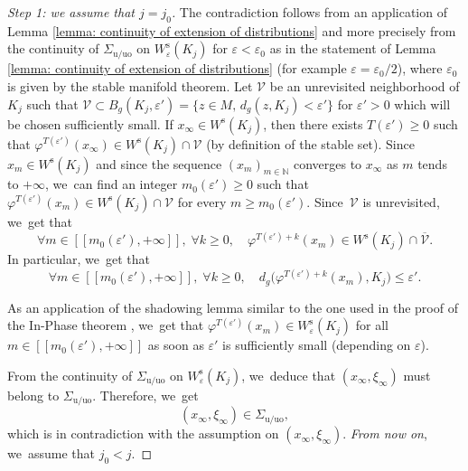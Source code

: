 \documentclass[JEP,XML,SOM,Unicode,NoEqCountersInSection,NoFloatCountersInSection,published]{cedram}
\newcommand{\lcr}{[\![}
\newcommand{\rcr}{]\!]}
\newcommand{\rs}{\mathrm{s}}
\newcommand{\ru}{\mathrm{u}}
\newcommand{\ruo}{\mathrm{uo}}
\theoremstyle{definition}
\theoremstyle{plain}
\newcommand{\N}{\mathbb{N}}
\newcommand{\Vcal}{\mathcal{V}}
\begin{document}
\begin{proof}[Step 1: we assume that $j = j_0$]
The contradiction follows from an application of Lemma \ref{lemma: continuity of extension of distributions} and more precisely from the continuity of $\Sigma_{\ru/\ruo}$ on $W_{\varepsilon}^\rs (K_j)$ for $\varepsilon < \varepsilon_0$ as in the statement of Lemma \ref{lemma: continuity of extension of distributions} (for example $\varepsilon = \varepsilon_0/2$), where $\varepsilon_0$ is given by the stable manifold theorem. Let $\Vcal$ be an unrevisited neighborhood of $K_j$ such that $\Vcal \subset B_g (K_j, \varepsilon') = \{z \in M,\, d_g (z, K_j) < \varepsilon' \}$ for $\varepsilon' > 0$ which will be chosen sufficiently small. If $x_{\infty} \in W^\rs (K_j)$, then there exists $T(\varepsilon') \geq 0$ such that $\varphi^{T (\varepsilon')} (x_{\infty}) \in W^\rs (K_j) \cap \Vcal$ (by definition of the stable set).
Since $x_m \in W^\rs (K_j)$ and since the sequence $(x_m)_{m \in \N}$ converges to $x_{\infty}$ as $m$ tends to $+\infty$, we~can find an integer $m_0 (\varepsilon') \geq 0$ such that $\varphi^{T(\varepsilon')} (x_m) \in W^\rs (K_j) \cap \Vcal$ for every $m \geq m_0 (\varepsilon')$. Since~$\Vcal$ is unrevisited, we~get that
\[
\forall m \in \lcr m_0 (\varepsilon'), +\infty \rcr,\;\forall k \geq 0, \quad \varphi^{T(\varepsilon') + k} (x_m) \in W^\rs (K_j) \cap \overline{\Vcal}.
\]
In particular, we~get that
\[
\forall m \in \lcr m_0 (\varepsilon'), +\infty \rcr,\; \forall k \geq 0, \quad d_g \bigl(\varphi^{T(\varepsilon') + k} (x_m), K_j \bigr) \leq \varepsilon'.
\]

As an application of the shadowing lemma \cite[Th.\,5.3.3]{FH} similar to the one used in the proof of the In-Phase theorem \cite[Th.\,5.3.25]{FH}, we~get that $\varphi^{T(\varepsilon')} (x_m) \in W_{\varepsilon}^\rs (K_j)$ for all $m \in \lcr m_0 (\varepsilon'), +\infty \rcr$ as soon as $\varepsilon'$ is sufficiently small (depending on $\varepsilon$).

From the continuity of $\Sigma_{\ru/\ruo}$ on $W_{\varepsilon}^\rs (K_j)$, we~deduce that $(x_{\infty}, \xi_{\infty})$ must belong to $\Sigma_{\ru/\ruo}$. Therefore, we~get
\[
(x_{\infty}, \xi_{\infty}) \in \Sigma_{\ru/\ruo},
\]
which is in contradiction with the assumption on $(x_{\infty}, \xi_{\infty})$. \emph{From now on}, we~assume that
$j_0 < j$.


\end{proof}
\end{document}
